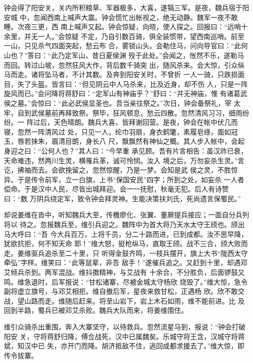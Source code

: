 钟会得了阳安关，关内所积粮草、军器极多，大喜，遂犒三军。是夜，魏兵宿于阳安城
中，忽闻西南上喊声大震。钟会慌忙出帐视之，绝无动静。魏军一夜不敢睡。次夜三更，西
南上喊声又起。钟会惊疑，向晓，使人探之。回报曰：“远哨十余里，并无一人。”会惊疑
不定，乃自引数百骑，俱全装惯带，望西南巡哨。前至一山，只见杀气四面突起，愁云布
合，雾锁山头。会勒住马，问向导官曰：“此何山也？”答曰：“此乃定军山，昔日夏侯渊
殁于此处。”会闻之，怅然不乐，遂勒马而回。转过山坡，忽然狂风大作，背后数千骑突
出，随风杀来。会大惊，引众纵马而走。诸将坠马者，不计其数。及奔到阳安关时，不曾折
一人一骑，只跌损面目，失了头盔。皆言曰：“但见阴云中人马杀来，比及近身，却不伤
人，只是一阵旋风而已。”会问降将蒋舒曰：“定军山有神庙乎？”舒曰：“并无神庙，惟
有诸葛武侯之墓。”会惊曰：“此必武侯显圣也。吾当亲往祭之。”次日，钟会备祭礼，宰
太牢，自到武侯墓前再拜致祭。祭毕，狂风顿息，愁云四散。忽然清风习习，细雨纷纷。一
阵过后，天色晴朗。魏兵大喜，皆拜谢回营。是夜，钟会在帐中伏几而寝，忽然一阵清风过
处，只见一人，纶巾羽扇，身衣鹤氅，素履皂绦，面如冠玉，唇若抹朱，眉清目朗，身长八
尺，飘飘然有神仙之概。其人步入帐中，会起身迎之曰：“公何人也？”其人曰：“今早重
承见顾。吾有片言相告：虽汉祚已衰，天命难违，然两川生灵，横罹兵革，诚可怜悯。汝入
境之后，万勿妄杀生灵。”言讫，拂袖而去。会欲挽留之，忽然惊醒，乃是一梦。会知是武
侯之灵，不胜惊异。于是传令前军，立一白旗，上书“保国安民”四字；所到之处，如妄杀
一人者偿命。于是汉中人民，尽皆出城拜迎。会一一抚慰，秋毫无犯。后人有诗赞曰：“数
万阴兵绕定军，致令钟会拜灵神。生能决策扶刘氏，死尚遗言保蜀民。”

却说姜维在沓中，听知魏兵大至，传檄廖化、张翼、董厥提兵接应；一面自分兵列将以
待之。忽报魏兵至，维引兵迎之。魏阵中为首大将乃天水太守王颀也。颀出马大呼曰：“吾
今大兵百万，上将千员，分二十路而进，已到成都。汝不思早降，犹欲抗拒，何不知天命
耶！”维大怒，挺枪纵马，直取王颀。战不三合，颀大败而走。姜维驱兵追杀至二十里，只
听得金鼓齐鸣，一枝兵摆开，旗上大书“陇西太守牵弘”字样。维笑曰：“此等鼠辈，非吾
敌手！”遂催兵追之。又赶到十里，却遇邓艾倾兵杀到。两军混战。维抖擞精神，与艾战有
十余合，不分胜负，后面锣鼓又鸣。维急退时，后军报说：“甘松诸寨，尽被金城太守杨欣
烧毁了。”维大惊，急令副将虚立旗号，与邓艾相拒。维自撤后军，星夜来救甘松，正遇杨
欣。欣不敢交战，望山路而走。维随后赶来。将至山岩下，岩上木石如雨，维不能前进。比
及回到半路，蜀兵已被邓艾杀败。魏兵大队而来，将姜维围住。

维引众骑杀出重围，奔入大寨坚守，以待救兵。忽然流星马到，报说：“钟会打破阳安
关，守将蒋舒归降，傅佥战死，汉中已属魏矣。乐城守将王含，汉城守将蒋斌，知汉中已
失，亦开门而降。胡济抵敌不住，逃回成都求援去了。”维大惊，即传令拔寨。

